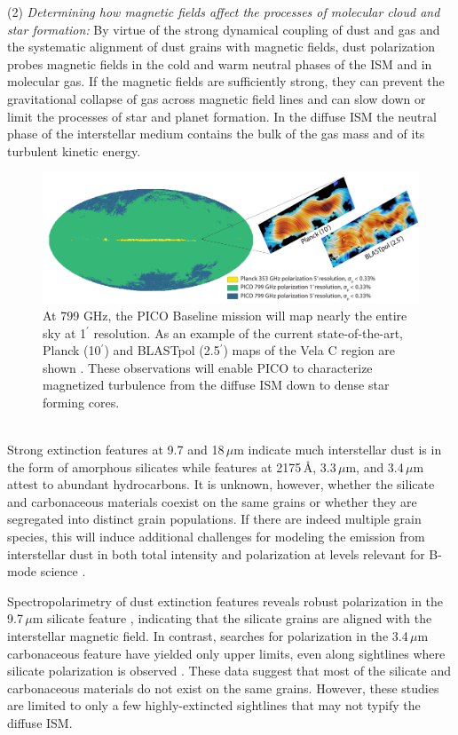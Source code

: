 \documentclass[PICOReport.tex]{subfiles}
\begin{document}
(2) {\em Determining how magnetic fields affect the processes of molecular cloud and star formation:}
By virtue of the strong dynamical coupling of dust and gas and the systematic alignment of dust grains with magnetic fields, dust polarization probes magnetic fields in 
the cold and warm neutral phases of the ISM and in molecular gas.
If the magnetic fields are sufficiently strong, they can prevent the gravitational collapse of gas across magnetic field lines and can slow down or limit the processes of star and planet formation.
In the diffuse ISM the neutral phase of the interstellar medium contains the bulk of the gas mass 
and of its turbulent kinetic energy.
%
%
\begin{figure}
    \centering
    \includegraphics[width=6in]{galsci_fig.pdf}
    \caption{At 799 GHz, the PICO Baseline mission will map nearly the entire sky at 1$^{\prime}$ resolution. As an example of the current state-of-the-art, Planck (10$^{\prime}$) and BLASTpol (2.5$^{\prime}$) maps of the Vela C region are shown \citep{Fissel2016}. These observations will enable PICO to characterize magnetized turbulence from the diffuse ISM down to dense star forming cores.}
    \label{fig:allsky}
\end{figure}

\vspace{0.1in}
 \\
Strong extinction features at 9.7 and 18\,$\mu$m indicate much interstellar dust is in the form of amorphous silicates while features at 2175\,\AA, 3.3\,$\mu$m, and 3.4\,$\mu$m attest to abundant hydrocarbons. It is unknown, however, whether the silicate and carbonaceous materials coexist on the same grains or whether they are segregated into distinct grain populations. If there are indeed multiple grain species, this will induce additional challenges for modeling the emission from interstellar dust in both total intensity and polarization at levels relevant for B-mode science \citep{Hensley2018}.

Spectropolarimetry of dust extinction features reveals robust polarization in the 9.7\,$\mu$m silicate feature \citep[e.g.,][]{Smith2000}, indicating that the silicate grains are aligned with the interstellar magnetic field. In contrast, searches for polarization in the 3.4\,$\mu$m carbonaceous feature have yielded only upper limits, even along sightlines where silicate polarization is observed \citep{Chiar2006,Mason2007}. These data suggest that most of the silicate and carbonaceous materials do not exist on the same grains. However, these studies are limited to only a few highly-extincted sightlines that may not typify the diffuse ISM.
\end{document}
